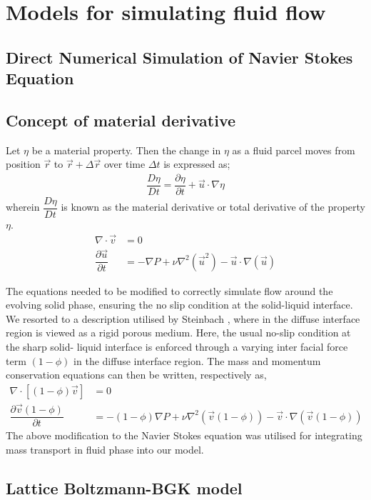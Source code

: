 \documentclass[12pt,a4paper]{report}
\begin{document}
\chapter{Models for simulating fluid flow}
	
\section{Direct Numerical Simulation of Navier Stokes Equation}
	\section{Concept of material derivative}
		Let $\eta$ be a material property. Then the change in $\eta$ as a fluid parcel moves from position $\vec{r}$ to $\vec{r}+\Delta \vec{r}$ over time $\Delta t$ is expressed as;
		\begin{align}
			\dfrac{D\eta}{Dt} = \dfrac{\partial \eta}{\partial t} + \vec{u}\cdot\nabla\eta
		\end{align}
	wherein $\dfrac{D\eta}{Dt}$ is known as the material derivative or total derivative of the property $\eta$. 
	\begin{align}
		\nabla\cdot\vec{v} &= 0\\
		\dfrac{\partial \vec{u}}{\partial t} &= - \nabla P + \nu\nabla^2\left(\vec{u}^2\right) - \vec{u}\cdot\nabla\left(\vec{u}\right)
	\end{align}
	
	The equations needed to be modified to correctly simulate flow around the evolving solid phase, ensuring the no slip condition
	at the solid-liquid interface. We resorted to a description utilised by Steinbach \cite{Stein}, where in the diffuse interface 
	region is viewed as a rigid porous medium. Here, the usual no-slip condition at the sharp solid- 
	liquid interface is enforced through a varying inter facial force term $(1-\phi)$ in the diffuse interface 
	region.
	The mass and momentum conservation equations can then be written, respectively as,
	\begin{align}
		\nabla\cdot[(1-\phi)\vec{v}] &= 0\\
		\dfrac{\partial \vec{v}(1-\phi)}{\partial t} &= -(1-\phi)\nabla P + \nu\nabla^2\left(\vec{v}(1-\phi)\right) - \vec{v}\cdot\nabla\left(\vec{v}(1-\phi)\right)
	\end{align}
	The above modification to the Navier Stokes equation was utilised for integrating mass transport in fluid phase into our model.

\section{Lattice Boltzmann-BGK model}
	
\end{document}
